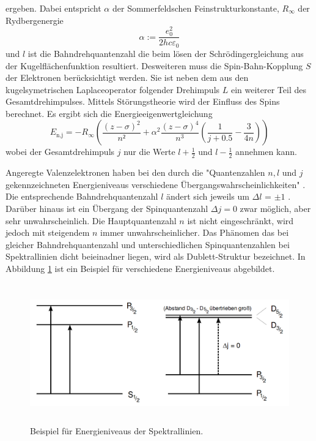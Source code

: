 ergeben. Dabei entspricht $\alpha$ der Sommerfeldschen Feinstrukturkonstante, $R_{\infty}$ der Rydbergenergie
\begin{equation}
  \alpha := \frac{e_0^2}{2 h c \varepsilon_0}
  \label{eqn:alpha}
\end{equation}
und $l$ ist die Bahndrehquantenzahl die beim lösen der Schrödingergleichung aus der Kugelflächenfunktion resultiert. Desweiteren muss die Spin-Bahn-Kopplung $S$ der Elektronen berücksichtigt werden. Sie ist neben dem aus den kugelsymetrischen Laplaceoperator folgender Drehimpuls $L$ ein weiterer Teil des Gesamtdrehimpulses. Mittels Störungstheorie wird der Einfluss des Spins berechnet. Es ergibt sich die Energieeigenwertgleichung
\begin{equation}
  E_\text{n,j} = -R_{\infty}\left( \frac{(z - \sigma)^2}{n²} + \alpha^2 \frac{(z - \sigma)^4}{n^3} \left( \frac{1}{j + 0.5} - \frac{3}{4n} \right) \right)
  \label{<++>}
\end{equation}
wobei der Gesamtdrehimpuls $j$ nur die Werte $l + \frac{1}{2}$ und $l - \frac{1}{2}$ annehmen kann.

Angeregte Valenzelektronen haben bei den durch die "Quantenzahlen $n ,l$ und $j$ gekennzeichneten Energieniveaus verschiedene Übergangswahrscheinlichkeiten" \cite{sample}. Die entsprechende Bahndrehquantenzahl $l$ ändert sich jeweils um $\Delta l$ = $\pm 1$ . Darüber hinaus ist ein Übergang der Spinquantenzahl $\Delta j = 0$ zwar möglich, aber sehr unwahrscheinlich. Die Hauptquantenzahl $n$ ist nicht eingeschränkt, wird jedoch mit steigendem $n$ immer unwahrscheinlicher. Das Phänomen das bei gleicher Bahndrehquantenzahl und unterschiedlichen Spinquantenzahlen bei Spektrallinien dicht beieinadner liegen, wird als Dublett-Struktur bezeichnet. In Abbildung \ref{fig:ene} ist ein Beispiel für verschiedene Energieniveaus abgebildet.

\begin{figure}
  \centering
  \includegraphics[height=6cm]{picture/eniv.png}
  \caption{Beispiel für Energieniveaus der Spektrallinien. \cite{sample}}
  \label{fig:ene}
\end{figure}

